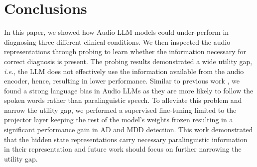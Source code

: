 \documentclass{article}
\begin{document}

\section{Conclusions}  
In this paper, we showed how Audio LLM models could under-perform in diagnosing three different clinical conditions. We then inspected the audio representations through probing to learn whether the information necessary for correct diagnosis is present. The probing results demonstrated a wide utility gap, \textit{i.e.}, the LLM does not effectively use the information available from the audio encoder, hence, resulting in lower performance. Similar to previous work \cite{voxparadox}, we found a strong language bias in Audio LLMs as they are more likely to follow the spoken words rather than paralinguistic speech. To alleviate this problem and narrow the utility gap, we performed a supervised fine-tuning limited to the projector layer keeping the rest of the model's weights frozen {\color{red} resulting in a significant performance gain in AD and MDD detection.} This work demonstrated that the hidden state representations carry necessary paralinguistic information in their representation and future work should focus on further narrowing the utility gap.
\end{document}
